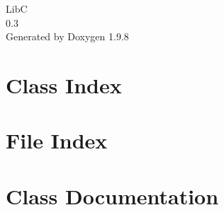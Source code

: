 \documentclass[twoside]{book}
\newcommand{\+}{\discretionary{\mbox{\scriptsize$\hookleftarrow$}}{}{}}
\newcommand{\clearemptydoublepage}{%
    \newpage{\pagestyle{empty}\cleardoublepage}%
  }
\begin{document}
  \raggedbottom
    \hypersetup{pageanchor=false,
                bookmarksnumbered=true,
                pdfencoding=unicode
               }
  \begin{titlepage}
  \vspace*{7cm}
  \begin{center}%
  {\Large LibC}\\
  [1ex]\large 0.\+3 \\
  \vspace*{1cm}
  {\large Generated by Doxygen 1.9.8}\\
  \end{center}
  \end{titlepage}
  \clearemptydoublepage
  \tableofcontents
  \clearemptydoublepage
  \hypersetup{pageanchor=true}

\chapter{Class Index}

\chapter{File Index}

\chapter{Class Documentation}
































\end{document}
